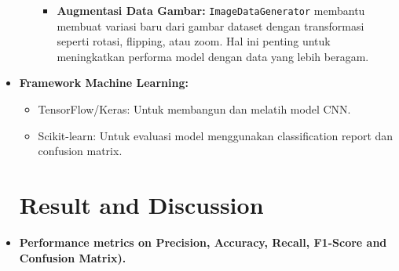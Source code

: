 \documentclass[12pt,a4paper]{article}
\begin{document}
\begin{itemize}
\begin{itemize}
\begin{itemize}
    \item \textbf{Augmentasi Data Gambar:} 
    \texttt{ImageDataGenerator} membantu membuat variasi baru dari gambar dataset dengan transformasi seperti rotasi, flipping, atau zoom. Hal ini penting untuk meningkatkan performa model dengan data yang lebih beragam.
\end{itemize}
\end{itemize}

\item \textbf{Framework Machine Learning:}
\begin{itemize}
        \item TensorFlow/Keras: Untuk membangun dan melatih model CNN.
        \item Scikit-learn: Untuk evaluasi model menggunakan classification report dan confusion matrix.
\end{itemize}


\newpage
\section{\uppercase Result and Discussion}
    \item \textbf {Performance metrics on Precision, Accuracy, Recall, F1-Score and Confusion Matrix).}


\end{itemize}
\end{document}
